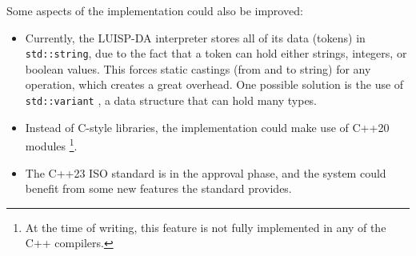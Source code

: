 \noindent
Some aspects of the implementation could also be improved:
\begin{itemize}
  \item Currently, the LUISP-DA interpreter stores all of its data (tokens) in \texttt{std::string}, due to the fact that a token can hold either strings, integers, or boolean values. This forces static castings (from and to string) for any operation, which creates a great overhead. One possible solution is the use of \texttt{std::variant} \parencite{stdVariant}, a data structure that can hold many types.
  \item Instead of C-style libraries, the implementation could make use of C++20 modules \parencite{cpp20modules}\footnote{At the time of writing, this feature is not fully implemented in any of the C++ compilers.}.
  \item The C++23 ISO standard \parencite{ISOcpp23} is in the approval phase, and the system could benefit from some new features the standard provides.
\end{itemize}